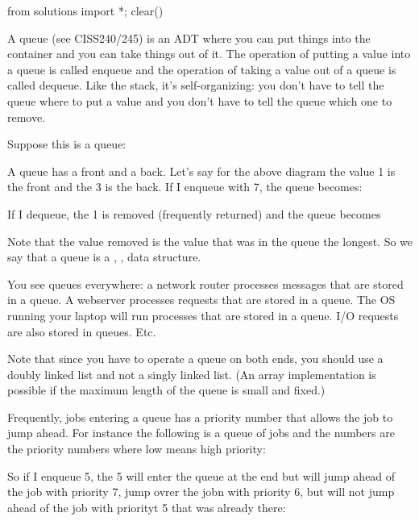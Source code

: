 \begin{python0}
from solutions import *; clear()
\end{python0}

A queue (see CISS240/245) is an ADT where you can put things into the container
and you can take things out of it.
The operation of putting a value into a queue is called enqueue
and the operation of taking a value out of a queue is called dequeue.
Like the stack, it's self-organizing: you don't have to tell the
queue where to put a value and you don't have to tell the queue
which one to remove.

Suppose this is a queue:



A queue has a front and a back.
Let's say for the above diagram the value 1 is the front and the 3 is the back.
If I enqueue with 7, the queue becomes:



If I dequeue, the 1 is removed (frequently returned) and the queue
becomes



Note that the value removed is the value that was in the queue the
longest.
So we say that a queue is a
,
,
data structure.

You see queues everywhere:
a network router processes messages that are stored in a queue.
A webserver processes requests that are stored in a queue.
The OS running your laptop will run processes that are stored in a queue.
I/O requests are also stored in queues.
Etc.

Note that since you have to operate a queue on both ends,
you should use a doubly linked list and not a singly linked list.
(An array implementation is possible if the maximum length of the
queue is small and fixed.)

Frequently, jobs entering a queue has a priority number
that allows the job to jump ahead.
For instance the following is a queue of jobs and the
numbers are the priority numbers where low means high priority:



So if I enqueue 5, the 5 will enter the queue at the end
but will jump ahead of the job with priority 7,
jump ovrer the jobn with priority 6, but will not jump ahead of the
job with priorityt 5 that was already there:

